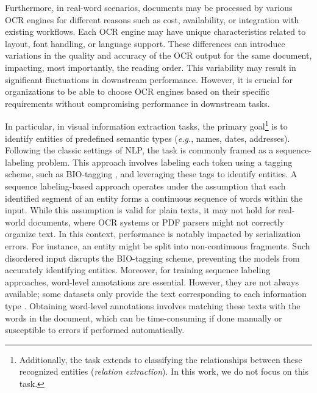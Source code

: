 Furthermore, in real-word scenarios, documents may be processed by various \ac{OCR} engines for different reasons such as cost, availability, or integration with existing workflows. Each \ac{OCR} engine may have unique characteristics related to layout, font handling, or language support. These differences can introduce variations in the quality and accuracy of the \ac{OCR} output for the same document, impacting, most importantly, the reading order. This variability may result in significant fluctuations in downstream performance. However, it is crucial for organizations to be able to choose \ac{OCR} engines based on their specific requirements without compromising performance in downstream tasks.


In particular, in visual information extraction tasks, the primary goal\footnote{Additionally, the task extends to classifying the relationships between these recognized entities (\textit{relation extraction}). In this work, we do not focus on this task.} is to identify entities of predefined semantic types (\textit{e.g.}, names, dates, addresses). Following the classic settings of \ac{NLP}, the task is commonly framed as a sequence-labeling problem. This approach involves labeling each token using a tagging scheme, such as BIO-tagging \citep{ramshaw1999text}, and leveraging these tags to identify entities. A sequence labeling-based approach operates under the assumption that each identified segment of an entity forms a continuous sequence of words within the input. While this assumption is valid for plain texts, it may not hold for real-world documents, where \ac{OCR} systems or PDF parsers might not correctly organize text. In this context, performance is notably impacted by serialization errors. For instance, an entity might be split into non-continuous fragments. Such disordered input disrupts the BIO-tagging scheme, preventing the models from accurately identifying entities. Moreover, for training sequence labeling approaches, word-level annotations are essential. However, they are not always available; some datasets only provide the text corresponding to each information type \citep{gralinski2020kleister}. Obtaining word-level annotations involves matching these texts with the words in the document, which can be time-consuming if done manually or susceptible to errors if performed automatically.

